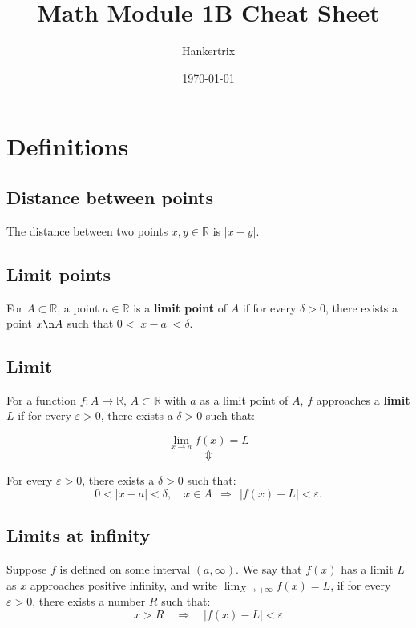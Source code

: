 \documentclass[11pt]{article}
\author{Hankertrix}
\date{\today}
\title{Math Module 1B Cheat Sheet}
\begin{document}
\maketitle
\setcounter{tocdepth}{2}
\tableofcontents

\newpage

\section{Definitions}
\label{sec:org6abed0f}

\subsection{Distance between points}
\label{sec:org2f1acc5}
The distance between two points \(x, y \in \mathbb{R}\) is \(|x - y|\).

\subsection{Limit points}
\label{sec:org03814fe}
For \(A \subset \mathbb{R}\), a point \(a \in \mathbb{R}\) is a \textbf{limit point} of \(A\) if for every \(\delta >0\), there exists a point \(x \n A\) such that \(0 < |x - a| < \delta\).

\subsection{Limit}
\label{sec:orge267753}
For a function \(f : A \rightarrow \mathbb{R}, \, A \subset \mathbb{R}\) with \(a\) as a limit point of \(A\), \(f\) approaches a \textbf{limit} \(L\) if for every \(\varepsilon > 0\), there exists a \(\delta > 0\) such that:

\[\lim_{x \rightarrow a} f(x) = L\]
\[\Updownarrow\]

For every \(\varepsilon > 0\), there exists a \(\delta > 0\) such that:
\[0 < |x - a| < \delta, \quad x \in A \ \ \Rightarrow \ \ |f(x) - L| < \varepsilon.\]

\subsection{Limits at infinity}
\label{sec:orga092976}
Suppose \(f\) is defined on some interval \((a, \infty)\). We say that \(f(x)\) has a limit \(L\) as \(x\) approaches positive infinity, and write \(\lim_{X \rightarrow + \infty} f(x) = L\), if for every \(\varepsilon > 0\), there exists a number \(R\) such that:
\[x > R \quad \Rightarrow \quad |f(x) - L| < \varepsilon\]
\end{document}
